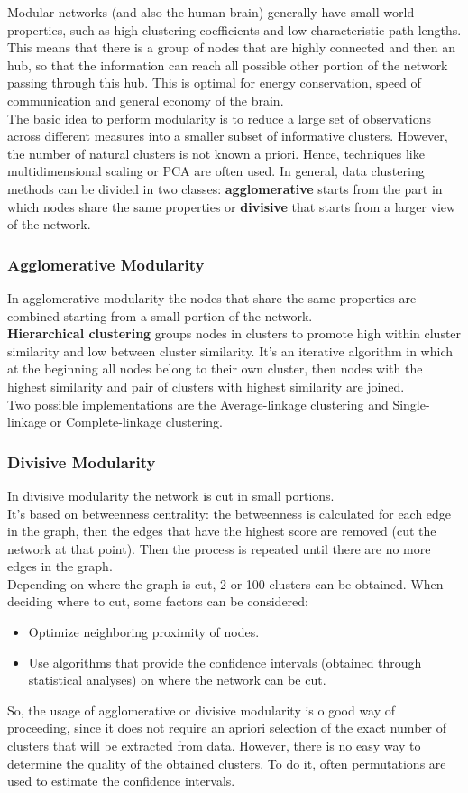 Modular networks (and also the human brain) generally have small-world properties, such as high-clustering coefficients and low characteristic path lengths. \\
This means that there is a group of nodes that are highly connected and then an hub, so that the information can reach all possible other portion of the network passing through this hub. This is optimal for energy conservation, speed of communication and general economy of the brain.\\
The basic idea to perform modularity is to reduce a large set of observations across different measures into a smaller subset of informative clusters. However, the number of natural clusters is not known a priori. Hence, techniques like multidimensional scaling or PCA are often used. In general, data clustering methods can be divided in two classes: \textbf{agglomerative} starts from the part in which nodes share the same properties or \textbf{divisive} that starts from a larger view of the network.
\subsubsection{Agglomerative Modularity}
In agglomerative modularity the nodes that share the same properties are combined starting from a small portion of the network.\\
\textbf{Hierarchical clustering} groups nodes in clusters to promote high within cluster similarity and low between cluster similarity. It's an iterative algorithm in which at the beginning all nodes belong to their own cluster, then nodes with the highest similarity and pair of clusters with highest similarity are joined.\\
Two possible implementations are the Average-linkage clustering and Single-linkage or Complete-linkage clustering.
\subsubsection{Divisive Modularity}
In divisive modularity the network is cut in small portions. \\
It's based on betweenness centrality: the betweenness is calculated for each edge in the graph, then the edges that have the highest score are removed (cut the network at that point). Then the process is repeated until there are no more edges in the graph.\\
Depending on where the graph is cut, 2 or 100 clusters can be obtained. When deciding where to cut, some factors can be considered:
\begin{itemize}
    \item Optimize neighboring proximity of nodes.
    \item Use algorithms that provide the confidence intervals (obtained through statistical analyses) on where the network can be cut.
\end{itemize}
So, the usage of agglomerative or divisive modularity is o good way of proceeding, since it does not require an apriori selection of the exact number of clusters that will be extracted from data. However, there is no easy way to determine the quality of the obtained clusters. To do it, often permutations are used to estimate the confidence intervals.
